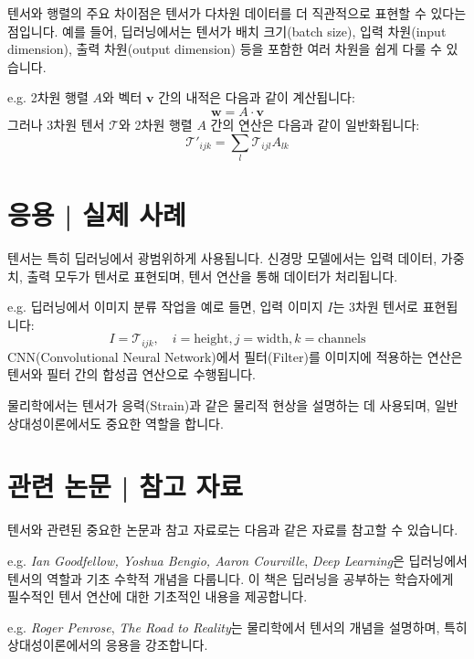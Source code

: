 \documentclass[12pt]{article}
\begin{document}
\vspace{1\baselineskip}
\noindent 텐서와 행렬의 주요 차이점은 텐서가 다차원 데이터를 더 직관적으로 표현할 수 있다는 점입니다. 예를 들어, 딥러닝에서는 텐서가 배치 크기(batch size), 입력 차원(input dimension), 출력 차원(output dimension) 등을 포함한 여러 차원을 쉽게 다룰 수 있습니다.

\vspace{1\baselineskip}
\noindent {} e.g. 2차원 행렬 \( A \)와 벡터 \( \mathbf{v} \) 간의 내적은 다음과 같이 계산됩니다:
\[
  \mathbf{w} = A \cdot \mathbf{v}
\]
그러나 3차원 텐서 \( \mathcal{T} \)와 2차원 행렬 \( A \) 간의 연산은 다음과 같이 일반화됩니다:
\[
  \mathcal{T'}_{ijk} = \sum_l \mathcal{T}_{ijl} A_{lk}
\]

\section{응용 | 실제 사례}

\noindent 텐서는 특히 딥러닝에서 광범위하게 사용됩니다. 신경망 모델에서는 입력 데이터, 가중치, 출력 모두가 텐서로 표현되며, 텐서 연산을 통해 데이터가 처리됩니다.

\vspace{1\baselineskip}
\noindent {} e.g. 딥러닝에서 이미지 분류 작업을 예로 들면, 입력 이미지 \( I \)는 3차원 텐서로 표현됩니다:
\[
  I = \mathcal{T}_{ijk}, \quad i = \text{height}, j = \text{width}, k = \text{channels}
\]
CNN(Convolutional Neural Network)에서 필터(Filter)를 이미지에 적용하는 연산은 텐서와 필터 간의 합성곱 연산으로 수행됩니다.

\noindent 물리학에서는 텐서가 응력(Strain)과 같은 물리적 현상을 설명하는 데 사용되며, 일반 상대성이론에서도 중요한 역할을 합니다.

\section{관련 논문 | 참고 자료}

\noindent 텐서와 관련된 중요한 논문과 참고 자료로는 다음과 같은 자료를 참고할 수 있습니다.

\noindent {} e.g. \textit{Ian Goodfellow, Yoshua Bengio, Aaron Courville}, \textit{Deep Learning}은 딥러닝에서 텐서의 역할과 기초 수학적 개념을 다룹니다. 이 책은 딥러닝을 공부하는 학습자에게 필수적인 텐서 연산에 대한 기초적인 내용을 제공합니다.

\vspace{1\baselineskip}
\noindent {} e.g. \textit{Roger Penrose}, \textit{The Road to Reality}는 물리학에서 텐서의 개념을 설명하며, 특히 상대성이론에서의 응용을 강조합니다.
\end{document}
